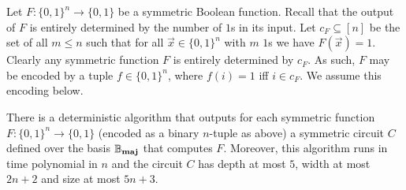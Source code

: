 \documentclass[../main/thesis.tex]{subfiles}
\begin{document}
Let $F : \{0,1\}^n\rightarrow \{0,1\}$ be a symmetric Boolean function. Recall
that the output of $F$ is entirely determined by the number of $1$s in its
input. Let $c_{F} \subseteq [n]$ be the set of all $m \leq n$ such that for all
$\vec{x} \in \{ 0,1 \}^n$ with $m$ $1$s we have $F (\vec{x}) = 1$. Clearly any
symmetric function $F$ is entirely determined by $c_{F}$. As such, $F$ may be
encoded by a tuple $f \in \{0,1\}^{n}$, where $f (i) = 1 $ iff $i \in c_{F}$. We
assume this encoding below.
 
\begin{prop}
  \label{prop:fuctions-maj}
  There is a deterministic algorithm that outputs for each symmetric function
  $F: \{0,1\}^n \rightarrow \{0,1\}$ (encoded as a binary $n$-tuple as above) a
  symmetric circuit $C$ defined over the basis $\mathbb{B}_{\text{\textbf{maj}}}$ that computes $F$.
  Moreover, this algorithm runs in time polynomial in $n$ and the circuit $C$
  has depth at most $5$, width at most $2n+2$ and size at most $5n + 3$.
\end{prop}
\end{document}
